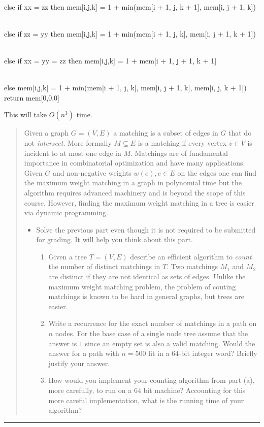 \documentclass[11pt]{article}
\begin{document}
\begin{solution}
\begin{algo}
        \\ else if xx = zz then mem[i,j,k] = 1 + min(mem[i + 1, j, k + 1], mem[i, j + 1, k])

        \\ else if zz = yy then mem[i,j,k] = 1 + min(mem[i + 1, j, k], mem[i, j + 1, k + 1])

        \\ else if xx = yy = zz then mem[i,j,k] = 1 + mem[i + 1, j + 1, k + 1]

        \\ else mem[i,j,k] = 1 + min(mem[i + 1, j, k], mem[i, j + 1, k], mem[i, j, k + 1]) \-\-\-
        \\ return mem[0,0,0]
    \end{algo}
    This will take $O(n^3)$ time.
\end{solution}


\begin{quote}
Given a graph $G=(V,E)$ a matching is a subset of edges in $G$
  that do not \emph{intersect}. More formally $M \subseteq E$ is a
  matching if every vertex $v \in V$ is incident to at most one edge
  in $M$. Matchings are of fundamental importance in combinatorial
  optimization and have many applications. Given $G$ and non-negative
  weights $w(e), e \in E$ on the edges one can find the maximum weight
  matching in a graph in polynomial time but the algorithm requires
  advanced machinery and is beyond the scope of this course. However,
  finding the maximum weight matching in a tree is easier via dynamic
  programming. 

  \begin{itemize}
  \item Solve the previous part even though it is not required to be
    submitted for grading. It will help you think about this part.
    \begin{enumerate}
    \item Given a tree $T=(V,E)$ describe an efficient algorithm to
      \emph{count} the number of distinct matchings in $T$. Two matchings
      $M_1$ and $M_2$ are distinct if they are not identical as sets of edges.
      Unlike the maximum weight matching problem, the problem of couting
      matchings is known to be hard in general graphs, but trees are
      easier. 
    \item Write a recurrence for the exact number of matchings in a
      path on $n$ nodes. For the base case of a single node tree
      assume that the answer is $1$ since an empty set is also a valid
      matching. Would the answer for a path with $n=500$ fit in a
      $64$-bit integer word? Briefly justify your answer.
    \item How would you implement your counting algorithm from part
      (a), more carefully, to run on a $64$ bit machine?  Accounting
      for this more careful implementation, what is the running time of
      your algorithm? 
    \end{enumerate}
  \end{itemize}
\end{quote}
\hrule
\end{document}
